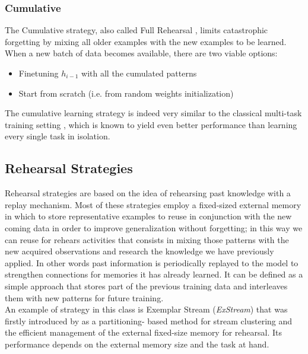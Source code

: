 \documentclass[english, LaM, oneside]{sapthesis}%
\begin{document}
\subsubsection{Cumulative} The Cumulative strategy, also called Full Rehearsal \cite{hayes}, limits catastrophic forgetting by mixing all older examples with the new examples to be learned. When a new batch of data becomes available, there are two viable options: 
\begin{itemize}
    \item Finetuning $h_{i - 1}$ with all the cumulated patterns
    \item Start from scratch (i.e. from random weights initialization)
\end{itemize}
The cumulative learning strategy is indeed very similar to the classical multi-task training setting \cite{caruana}, which is known to yield even better performance than learning every single task in isolation.
\subsection{Rehearsal Strategies}
Rehearsal strategies are based on the idea of rehearsing past knowledge with a replay mechanism. Most of these strategies employ a fixed-sized external memory in which to store representative examples to reuse in conjunction with the new coming data in order to improve generalization without forgetting; in this way we can reuse for rehears activities that consists  in mixing those patterns with the new acquired observations and research the knowledge we have previously applied. In other words past information is periodically replayed to the model to strengthen connections for memories it has already learned. It can be defined as a simple approach that stores part of the previous training data and interleaves them with new patterns for future training. 
\\
An example of strategy in this class is Exemplar Stream (\textit{ExStream}) that was firstly introduced by \cite{hayes} as a partitioning- based method for stream clustering and the efficient management of the external fixed-size memory for rehearsal. Its performance depends on the external memory size and the task at hand.
\end{document}
